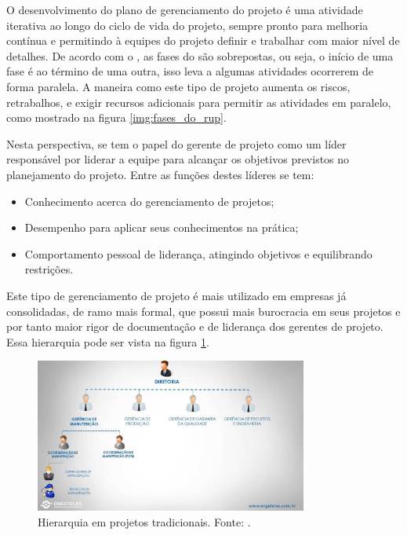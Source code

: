 O desenvolvimento do plano de gerenciamento do projeto é uma atividade iterativa ao longo do ciclo de vida do projeto, sempre pronto para melhoria contínua e permitindo à equipes do projeto definir e trabalhar com maior nível de detalhes. De acordo com o \cite{pmbok}, as fases do \cite{rup} são sobrepostas, ou seja, o início de uma fase é ao término de uma outra, isso leva a algumas atividades ocorrerem de forma paralela. A maneira como este tipo de projeto aumenta os riscos, retrabalhos, e exigir recursos adicionais para permitir as atividades em paralelo, como mostrado na figura \ref{img:fases_do_rup}.

Nesta perspectiva, se tem o papel do gerente de projeto como um líder responsável por liderar a equipe para alcançar os objetivos previstos no planejamento do projeto. Entre as funções destes líderes se tem:

\begin{itemize}
    \item Conhecimento acerca do gerenciamento de projetos;
    \item Desempenho para aplicar seus conhecimentos na prática;
    \item Comportamento pessoal de liderança, atingindo objetivos e equilibrando restrições.
\end{itemize}

Este tipo de gerenciamento de projeto é mais utilizado em empresas já consolidadas, de ramo mais formal, que possui mais burocracia em seus projetos e por tanto maior rigor de documentação e de liderança dos gerentes de projeto. Essa hierarquia pode ser vista na figura \ref{img:gerencia_de_projetos_tradicional}.

\begin{figure}[H]
	\centering
	\includegraphics[width=0.8\textwidth]{figuras/gerencia_de_projeto.jpg}
	\caption{Hierarquia em projetos tradicionais. Fonte: \cite{gerentes_tradicionais}.}
	\label{img:gerencia_de_projetos_tradicional}
\end{figure}

